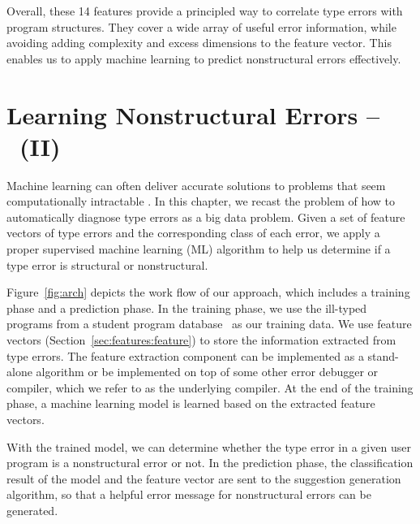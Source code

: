 \documentclass[12pt]{report}	%
\begin{document}
%
Overall, these 14 features provide a 
principled way to correlate type errors with
program structures.
They cover a wide array of useful error information, 
while avoiding adding complexity and 
excess dimensions to the feature vector.
This enables us to apply machine learning
to predict nonstructural errors effectively.

\chapter{Learning Nonstructural Errors -- \newCompiler\ (II)}
\label{sec:solution}

Machine learning can often deliver accurate solutions to problems
that seem computationally intractable \cite{Moitra14:AAML,Harmeling00solvingsatisfiability}.
In this chapter, we recast the problem of how to automatically diagnose type errors as a big data problem.
Given a set of feature vectors of type errors and the corresponding class of each error,
we apply a proper supervised machine learning (ML) algorithm to help us 
determine if a type error is structural or nonstructural.


Figure~\ref{fig:arch} depicts the work flow of our approach, 
which includes a training phase and a prediction phase.
%
In the training phase, 
we use the ill-typed programs from a student program database~\cite{Hage09:Neon} 
as our training data. 
We use feature vectors (Section~\ref{sec:features:feature}) to store the information extracted from type errors.
The feature extraction component
can be implemented as a stand-alone algorithm or be implemented
on top of some other error debugger or compiler, which we refer to as the
underlying compiler. 
At the end of the training phase,
a machine learning model is learned 
based on the extracted feature vectors.

With the trained model, 
we can determine whether 
the type error in a given user program
is a nonstructural error or not.
In the prediction phase,
the classification result of the model
and the feature vector are sent to the
suggestion generation algorithm, 
so that a helpful error message
for nonstructural errors
can be generated.
\end{document}
